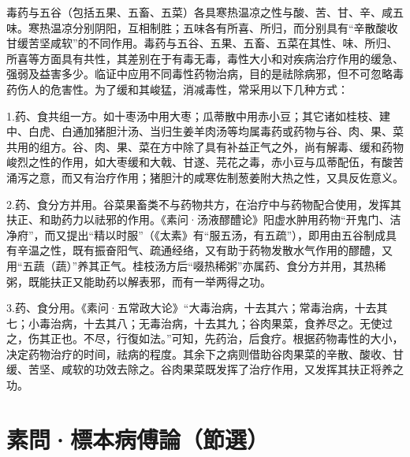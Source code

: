 \documentclass[draft,12pt]{ctexbook}
\begin{document}


毒药与五谷（包括五果、五畜、五菜）各具寒热温凉之性与酸、苦、甘、辛、咸五味。寒热温凉分别阴阳，互相制胜；五味各有所喜、所归，而分别具有“辛散酸收甘缓苦坚咸软”的不同作用。毒药与五谷、五果、五畜、五菜在其性、味、所归、所喜等方面具有共性，其差别在于有毒无毒，毒性大小和对疾病治疗作用的缓急、强弱及益害多少。临证中应用不同毒性药物治病，目的是祛除病邪，但不可忽略毒药伤人的危害性。为了缓和其峻猛，消减毒性，常采用以下几种方式：

1.药、食共组一方。如十枣汤中用大枣；瓜蒂散中用赤小豆；其它诸如桂枝、建中、白虎、白通加猪胆汁汤、当归生姜羊肉汤等均属毒药或药物与谷、肉、果、菜共用的组方。谷、肉、果、菜在方中除了具有补益正气之外，尚有解毒、缓和药物峻烈之性的作用，如大枣缓和大戟、甘遂、芫花之毒，赤小豆与瓜蒂配伍，有酸苦涌泻之意，而又有治疗作用；猪胆汁的咸寒佐制葱姜附大热之性，又具反佐意义。

2.药、食分方并用。谷菜果畜类不与药物共方，在治疗中与药物配合使用，发挥其扶正、和助药力以祛邪的作用。《素问·汤液醪醴论》阳虚水肿用药物“开鬼门、洁净府”，而又提出“精以时服”（《太素》有“服五汤，有五疏”），即用由五谷制成具有辛温之性，既有振奋阳气、疏通经络，又有助于药物发散水气作用的醪醴，又用“五蔬（蔬）”养其正气。桂枝汤方后“啜热稀粥”亦属药、食分方并用，其热稀粥，既能扶正又能助药以解表邪，而有一举两得之功。

3.药、食分用。《素问·五常政大论》“大毒治病，十去其六；常毒治病，十去其七；小毒治病，十去其八；无毒治病，十去其九；谷肉果菜，食养尽之。无使过之，伤其正也。不尽，行復如法。”可知，先药治，后食疗。根据药物毒性的大小，决定药物治疗的时间，祛病的程度。其余下之病则借助谷肉果菜的辛散、酸收、甘缓、苦坚、咸软的功效去除之。谷肉果菜既发挥了治疗作用，又发挥其扶正将养之功。


\section{素問·標本病傅論（節選）}%

\end{document}

